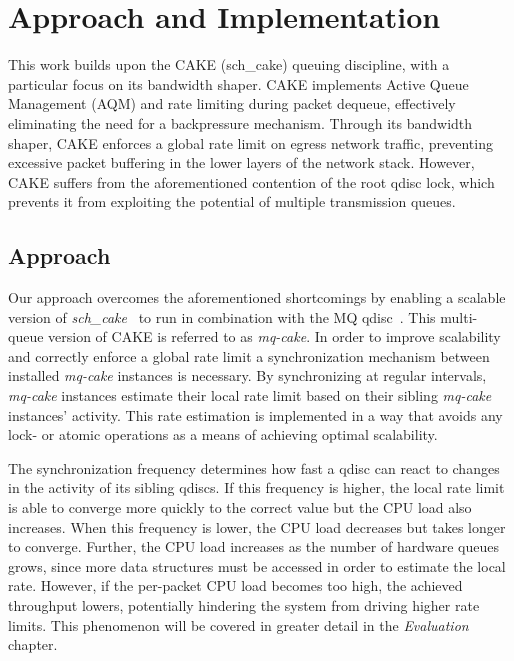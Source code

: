 \section{Approach and Implementation}
This work builds upon the CAKE (sch\_cake) queuing discipline, with a particular focus on its bandwidth shaper. CAKE implements Active Queue Management (AQM) and rate limiting during packet dequeue, effectively eliminating the need for a backpressure mechanism. Through its bandwidth shaper, CAKE enforces a global rate limit on egress network traffic, preventing excessive packet buffering in the lower layers of the network stack. However, CAKE suffers from the aforementioned contention of the root qdisc lock, which prevents it from exploiting the potential of multiple transmission queues.

\subsection{Approach}
Our approach overcomes the aforementioned shortcomings by enabling a scalable version of \textit{sch\_cake}~\cite{cake} to run in combination with the MQ qdisc~\cite{mq}.
%
This multi-queue version of CAKE is referred to as \textit{mq-cake}.
In order to improve scalability and correctly enforce a global rate limit a synchronization mechanism between installed \textit{mq-cake} instances is necessary.
%
By synchronizing at regular intervals, \textit{mq-cake} instances estimate their local rate limit based on their sibling \textit{mq-cake} instances' activity.  
%
This rate estimation is implemented in a way that avoids any lock- or atomic operations as a means of achieving optimal scalability.
%

The synchronization frequency determines how fast a qdisc can react to changes in the activity of its sibling qdiscs.
If this frequency is higher, the local rate limit is able to converge more quickly to the correct value but the CPU load also increases.
When this frequency is lower, the CPU load decreases but takes longer to converge.
%
Further, the CPU load increases as the number of hardware queues grows, since more data structures must be accessed in order to estimate the local rate.
%
However, if the per-packet CPU load becomes too high, the achieved throughput lowers, potentially hindering the system from driving higher rate limits.
This phenomenon will be covered in greater detail in the \textit{Evaluation} chapter.

